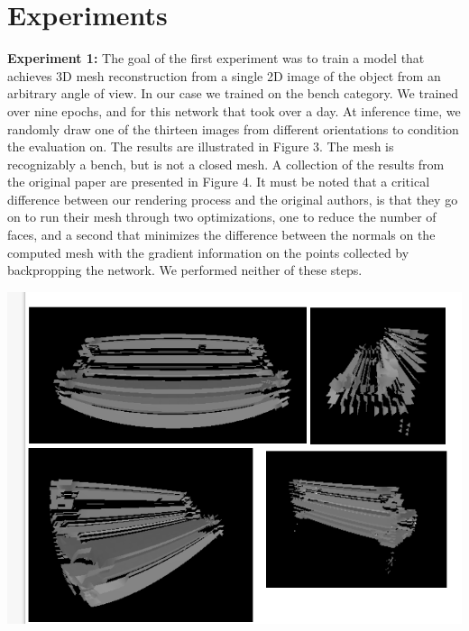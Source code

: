 \documentclass[11pt]{article}
\begin{document}
\section{Experiments}

\textbf{Experiment 1:} The goal of the first experiment was to train a model that achieves 3D mesh reconstruction from a single 2D image of the object from an arbitrary angle of view. In our case we trained on the bench category. We trained over nine epochs, and for this network that took over a day. At inference time, we randomly draw one of the thirteen images from different orientations to condition the evaluation on. The results are illustrated in Figure 3. The mesh is recognizably a bench, but is not a closed mesh. A collection of the results from the original paper are presented in Figure 4. It must be noted that a critical difference between our rendering process and the original authors, is that they go on to run their mesh through two optimizations, one to reduce the number of faces, and a second that minimizes the difference between the normals on the computed mesh with the gradient information on the points collected by backpropping the network. We performed neither of these steps.

\includegraphics[scale=0.6]{benchImages/benches.png}
\\
\end{document}
